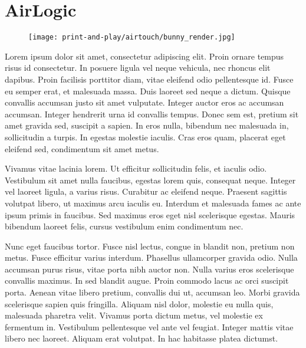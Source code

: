 \chapter{AirLogic} \label{ch:airlogic}
  \begin{figure}[h]
    \centering
    \texttt{[image: print-and-play/airtouch/bunny\_render.jpg]}
  \end{figure}


  Lorem ipsum dolor sit amet, consectetur adipiscing elit. Proin ornare tempus
  risus id consectetur. In posuere ligula vel neque vehicula, nec rhoncus elit
  dapibus. Proin facilisis porttitor diam, vitae eleifend odio pellentesque id.
  Fusce eu semper erat, et malesuada massa. Duis laoreet sed neque a dictum.
  Quisque convallis accumsan justo sit amet vulputate. Integer auctor eros ac
  accumsan accumsan. Integer hendrerit urna id convallis tempus. Donec sem est,
  pretium sit amet gravida sed, suscipit a sapien. In eros nulla, bibendum nec
  malesuada in, sollicitudin a turpis. In egestas molestie iaculis. Cras eros
  quam, placerat eget eleifend sed, condimentum sit amet metus.

  Vivamus vitae lacinia lorem. Ut efficitur sollicitudin felis, et iaculis odio.
  Vestibulum sit amet nulla faucibus, egestas lorem quis, consequat neque.
  Integer vel laoreet ligula, a varius risus. Curabitur ac eleifend neque.
  Praesent sagittis volutpat libero, ut maximus arcu iaculis eu. Interdum et
  malesuada fames ac ante ipsum primis in faucibus. Sed maximus eros eget nisl
  scelerisque egestas. Mauris bibendum laoreet felis, cursus vestibulum enim
  condimentum nec.

  Nunc eget faucibus tortor. Fusce nisl lectus, congue in blandit non, pretium
  non metus. Fusce efficitur varius interdum. Phasellus ullamcorper gravida
  odio. Nulla accumsan purus risus, vitae porta nibh auctor non. Nulla varius
  eros scelerisque convallis maximus. In sed blandit augue. Proin commodo lacus
  ac orci suscipit porta. Aenean vitae libero pretium, convallis dui ut,
  accumsan leo. Morbi gravida scelerisque sapien quis fringilla. Aliquam nisl
  dolor, molestie eu nulla quis, malesuada pharetra velit. Vivamus porta dictum
  metus, vel molestie ex fermentum in. Vestibulum pellentesque vel ante vel
  feugiat. Integer mattis vitae libero nec laoreet. Aliquam erat volutpat. In
  hac habitasse platea dictumst.

